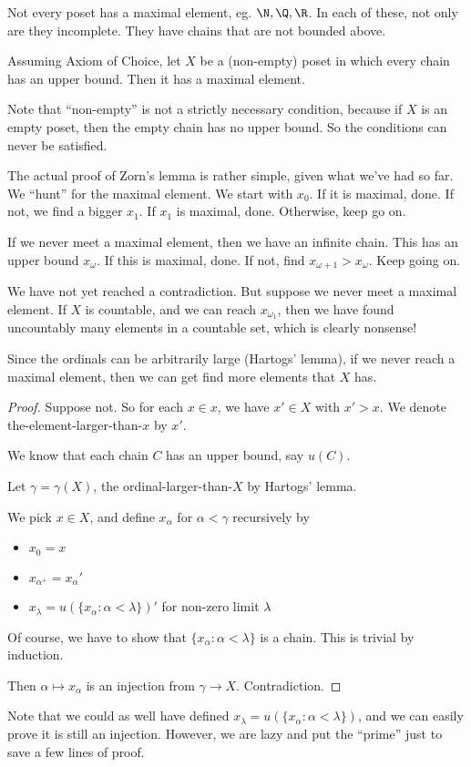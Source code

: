 \documentclass[a4paper]{article}
\begin{document}
Not every poset has a maximal element, eg. $\N, \Q, \R$. In each of these, not only are they incomplete. They have chains that are not bounded above.

\begin{thm}
  Assuming Axiom of Choice, let $X$ be a (non-empty) poset in which every chain has an upper bound. Then it has a maximal element.
\end{thm}
Note that ``non-empty'' is not a strictly necessary condition, because if $X$ is an empty poset, then the empty chain has no upper bound. So the conditions can never be satisfied.

The actual proof of Zorn's lemma is rather simple, given what we've had so far. We ``hunt'' for the maximal element. We start with $x_0$. If it is maximal, done. If not, we find a bigger $x_1$. If $x_1$ is maximal, done. Otherwise, keep go on.

If we never meet a maximal element, then we have an infinite chain. This has an upper bound $x_\omega$. If this is maximal, done. If not, find $x_{\omega + 1} > x_\omega$. Keep going on.

We have not yet reached a contradiction. But suppose we never meet a maximal element. If $X$ is countable, and we can reach $x_{\omega_1}$, then we have found uncountably many elements in a countable set, which is clearly nonsense!

Since the ordinals can be arbitrarily large (Hartogs' lemma), if we never reach a maximal element, then we can get find more elements that $X$ has.

\begin{proof}
  Suppose not. So for each $x\in x$, we have $x'\in X$ with $x' > x$. We denote the-element-larger-than-$x$ by $x'$.

  We know that each chain $C$ has an upper bound, say $u(C)$.

  Let $\gamma = \gamma(X)$, the ordinal-larger-than-$X$ by Hartogs' lemma.

  We pick $x\in X$, and define $x_\alpha$ for $\alpha < \gamma$ recursively by
  \begin{itemize}
    \item $x_0 = x$
    \item $x_{\alpha^+} = x_\alpha'$
    \item $x_{\lambda} = u(\{x_\alpha: \alpha < \lambda\})'$ for non-zero limit $\lambda$
  \end{itemize}
  Of course, we have to show that $\{x_\alpha: \alpha < \lambda\}$ is a chain. This is trivial by induction.

  Then $\alpha \mapsto x_\alpha$ is an injection from $\gamma\to X$. Contradiction.
\end{proof}
Note that we could as well have defined $x_\lambda = u(\{x_\alpha : \alpha < \lambda\})$, and we can easily prove it is still an injection. However, we are lazy and put the ``prime'' just to save a few lines of proof.
\end{document}

